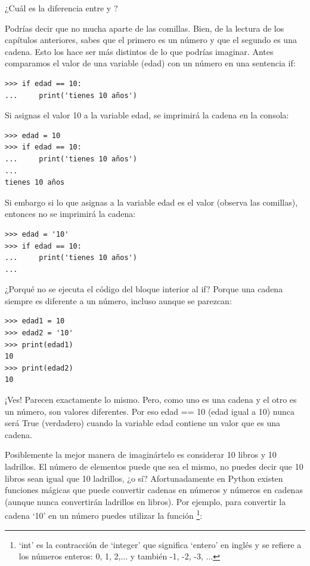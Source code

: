 ¿Cuál es la diferencia entre  y ?
\par
Podrías decir que no mucha aparte de las comillas.  Bien, de la lectura de los capítulos anteriores, sabes que el primero es un número y que el segundo es una cadena. Esto los hace ser más distintos de lo que podrías imaginar.  Antes comparamos el valor de una variable (edad) con un número en una sentencia if:

\begin{listing}
\begin{verbatim}
>>> if edad == 10:
...     print('tienes 10 años')
\end{verbatim}
\end{listing}

Si asignas el valor 10 a la variable edad, se imprimirá la cadena en la consola:

\begin{listing}
\begin{verbatim}
>>> edad = 10
>>> if edad == 10:
...     print('tienes 10 años')
...
tienes 10 años
\end{verbatim}
\end{listing}

Si embargo si lo que asignas a la variable edad es el valor  (observa las comillas), entonces no se imprimirá la cadena:

\begin{listing}
\begin{verbatim}
>>> edad = '10'
>>> if edad == 10:
...     print('tienes 10 años')
...
\end{verbatim}
\end{listing}

¿Porqué no se ejecuta el código del bloque interior al if?  Porque una cadena siempre es diferente a un número, incluso aunque se parezcan:

\begin{listing}
\begin{verbatim}
>>> edad1 = 10
>>> edad2 = '10'
>>> print(edad1)
10
>>> print(edad2)
10
\end{verbatim}
\end{listing}

¡Ves!  Parecen exactamente lo mismo.  Pero, como uno es una cadena y el otro es un número, son valores diferentes.  Por eso edad == 10 (edad igual a 10) nunca será True (verdadero) cuando la variable edad contiene un valor que es una cadena.
\par
Posiblemente la mejor manera de imaginártelo es considerar 10 libros y 10 ladrillos.  El número de elementos puede que sea el mismo, no puedes decir que 10 libros sean igual que 10 ladrillos, ¿o sí?  Afortunadamente en Python existen funciones mágicas que puede convertir cadenas en números y números en cadenas (aunque nunca convertirán ladrillos en libros). Por ejemplo, para convertir la cadena `10' en un número puedes utilizar la función \footnote{`int' es la contracción de `integer' que significa `entero' en inglés y se refiere a los números enteros: 0, 1, 2,... y también -1, -2, -3, ...}:

